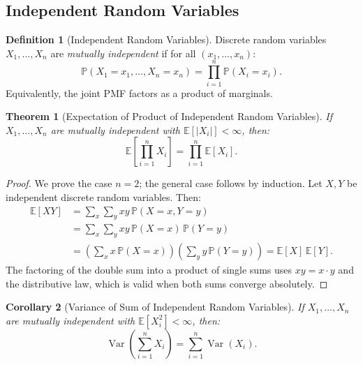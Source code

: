\documentclass[11pt,a4paper]{article}
\theoremstyle{definition}
\newtheorem{definition}{Definition}[section]
\theoremstyle{plain}
\newtheorem{theorem}{Theorem}[section]
\newtheorem{corollary}[theorem]{Corollary}
\theoremstyle{remark}
\DeclareMathOperator{\Var}{Var}
\newcommand{\E}{\mathbb{E}}
\newcommand{\Prob}{\mathbb{P}}
\begin{document}
\subsection{Independent Random Variables}
\label{subsec:indep_rv}

\begin{definition}[Independent Random Variables]
\label{def:indep_rv}
Discrete random variables $X_1, \ldots, X_n$ are \emph{mutually independent} if for all $(x_1, \ldots, x_n)$:
\begin{equation}
    \Prob(X_1 = x_1, \ldots, X_n = x_n) = \prod_{i=1}^n \Prob(X_i = x_i).
    \label{eq:indep_rv}
\end{equation}
Equivalently, the joint PMF factors as a product of marginals.
\end{definition}

\begin{keyresult}
\begin{theorem}[Expectation of Product of Independent Random Variables]
\label{thm:product_exp}
If $X_1, \ldots, X_n$ are mutually independent with $\E[|X_i|] < \infty$, then:
\begin{equation}
    \E\!\left[\prod_{i=1}^n X_i\right] = \prod_{i=1}^n \E[X_i].
    \label{eq:product_exp}
\end{equation}
\end{theorem}
\end{keyresult}

\begin{proof}
We prove the case $n = 2$; the general case follows by induction. Let $X, Y$ be independent discrete random variables. Then:
\begin{align}
    \E[XY] &= \sum_x \sum_y xy\, \Prob(X = x, Y = y) \nonumber\\
    &= \sum_x \sum_y xy\, \Prob(X = x)\, \Prob(Y = y) \tag{independence}\\
    &= \left(\sum_x x\, \Prob(X = x)\right)\left(\sum_y y\, \Prob(Y = y)\right) = \E[X]\, \E[Y]. \label{eq:product_exp_proof}
\end{align}
The factoring of the double sum into a product of single sums uses $xy = x \cdot y$ and the distributive law, which is valid when both sums converge absolutely.
\end{proof}

\begin{corollary}[Variance of Sum of Independent Random Variables]
\label{cor:var_sum}
If $X_1, \ldots, X_n$ are mutually independent with $\E[X_i^2] < \infty$, then:
\begin{equation}
    \Var\!\left(\sum_{i=1}^n X_i\right) = \sum_{i=1}^n \Var(X_i).
    \label{eq:var_sum}
\end{equation}
\end{corollary}
\end{document}
